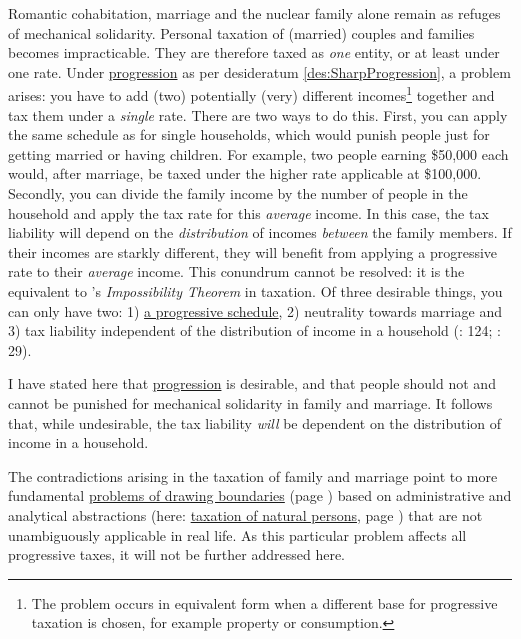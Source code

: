 
Romantic cohabitation, marriage and the nuclear family alone remain as refuges of mechanical solidarity. Personal taxation of (married) couples and families becomes impracticable. They are therefore taxed as \emph{one} entity, or at least under one rate. Under \href{des:SharpProgression}{progression} as per desideratum \ref{des:SharpProgression}, a problem arises: you have to add (two) potentially (very) different incomes\footnote{The problem occurs in equivalent form when a different base for progressive taxation is chosen, for example property or consumption.} together and tax them under a \emph{single} rate. There are two ways to do this. First, you can apply the same schedule as for single households, which would punish people just for getting married or having children. For example, two people earning \$50,000 each would, after marriage, be taxed under the higher rate applicable at \$100,000. Secondly, you can divide the family income by the number of people in the household and apply the tax rate for this \emph{average} income. In this case, the tax liability will depend on the \emph{distribution} of incomes \emph{between} the family members. If their incomes are starkly different, they will benefit from applying a progressive rate to their \emph{average} income. This conundrum cannot be resolved: it is the equivalent to \citeauthor{Arrow1950}'s \emph{Impossibility Theorem} in taxation. Of three desirable things, you can only have two: 1) \href{des:SharpProgression}{a progressive schedule}, 2) neutrality towards marriage and 3) tax liability independent of the distribution of income in a household (\citealt{Moffitt2003}: 124; \citealt{Dalsgaard2005}: 29). 

I have stated here that \href{des:SharpProgression}{progression} is desirable, and that people should not and cannot be punished for mechanical solidarity in family and marriage. It follows that, while undesirable, the tax liability \emph{will} be dependent on the distribution of income in a household.

The contradictions arising in the taxation of family and marriage point to more fundamental \href{sec:WorkPlay}{problems of drawing boundaries} (page \pageref{sec:WorkPlay}) based on administrative and analytical abstractions (here: \hyperref[des:PersonalTaxation]{taxation of natural persons}, page \pageref{des:PersonalTaxation}) that are not unambiguously applicable in real life. As this particular problem affects all progressive taxes, it will not be further addressed here. 

